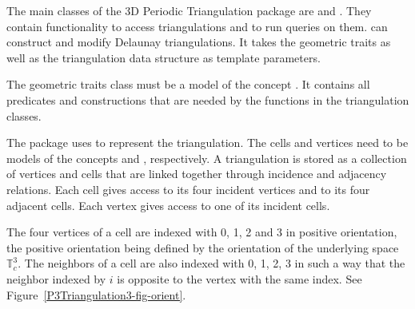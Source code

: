 


The main classes of the 3D Periodic Triangulation package are
 and
. They contain functionality
to access triangulations and to run queries on
them.  can construct and
modify Delaunay triangulations. It takes the geometric traits as well
as the triangulation data structure as template parameters. 

The geometric traits class must be a model of the concept
. It contains all
predicates and constructions that are needed by the functions in the
triangulation classes.

The package uses  to represent the
triangulation. The cells and vertices need to be models of the
concepts  and
, respectively.
A triangulation is stored as a collection of vertices and cells that
are linked together through incidence and adjacency relations. Each
cell gives access to its four incident vertices and to its four
adjacent cells. Each vertex gives access to one of its incident
cells.

The four vertices of a cell are indexed with 0, 1, 2 and 3 in positive
orientation, the positive orientation being defined by the orientation
of the underlying space $\mathbb T_c^3$. The neighbors of a cell are
also indexed with 0, 1, 2, 3 in such a way that the neighbor indexed
by $i$ is opposite to the vertex with the same index. See
Figure~\ref{P3Triangulation3-fig-orient}.

